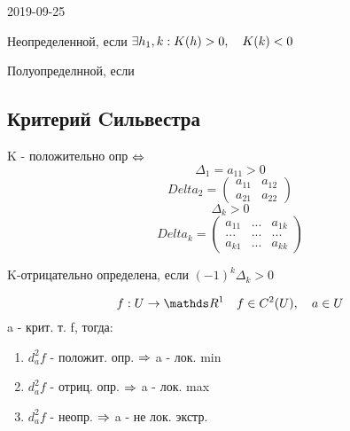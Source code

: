 \documentclass[main, 12pt, fleqn]{subfiles}
\begin{document}
\begin{lect} {2019-09-25}
\begin{Definition}
		Неопределенной, если $\exists h_1,k: K(h)>0,\quad K(k)<0$

		Полуопределнной, если
	\end{Definition}

	\subsection{Критерий Cильвестра}
	K - положительно опр $\Leftrightarrow$
	\[\Delta_1=a_{1 1}>0\]
	\[Delta_2=\begin{pmatrix} %
		a_{11} & a_{12}\\
		a_{21} & a_{22}
	\end{pmatrix}\]
	\[\Delta_k>0\]
	\[Delta_k=\begin{pmatrix}
		a_{11} & ... & a_{1k}\\
		...& ... & ... \\
		a_{k1} &...& a_{kk}
	\end{pmatrix}\]

	K-отрицательно определена, если $(-1)^k \Delta_k>0$

	\begin{Theorem}
		\[f: U \ra \R^1 \q f \in C^2(U), \q a \in U\]
		a - крит. т. f, тогда:
		\begin{enumerate}
			\item $d_a^2 f$ - положит. опр. $\Rightarrow$ a - лок. min
			\item $d_a^2 f$ - отриц. опр. $\Rightarrow$ a - лок. max
			\item $d_a^2 f$ - неопр. $\Rightarrow$ a - не лок. экстр.
		\end{enumerate}
	\end{Theorem}

%
\end{lect}
\end{document}
